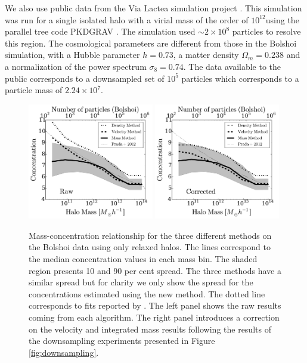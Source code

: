\documentclass{emulateapj}
\newcommand{\hMsun}{{\ifmmode{h^{-1}{\rm {M_{\odot}}}}\else{$h^{-1}{\rm{M_{\odot}}}$}\fi}}
\begin{document}
We also use public data from the Via Lactea simulation project
\citep{2008Natur.454..735D}.  
This simulation was run for a single isolated halo with a virial mass
of the order of $10^{12}$\hMsun using the parallel tree code PKDGRAV
\citep{2001PhDT........21S}.  
The simulation used $\sim 2\times 10^{8}$ particles to resolve this
region.
The cosmological parameters are different from those in the Bolshoi
simulation, with a Hubble parameter $h=0.73$, a matter density
$\Omega_m=0.238$ and a normalization of the power spectrum
$\sigma_8=0.74$. 
The data available to the public corresponds to a downsampled set 
of $10^5$ particles which corresponds to a particle mass of
$2.24\times 10^{7}$\hMsun.  





\begin{figure}
\begin{center}
  \includegraphics[width=0.49\textwidth]{concentration_bolshoi.pdf}
  \includegraphics[width=0.49\textwidth]{concentration_bolshoi_corrected.pdf}
\end{center}
\vspace{-0.5cm}
\caption{Mass-concentration relationship for the three different
  methods on the Bolshoi data using only relaxed halos.
  The lines correspond to the median concentration values in each mass
  bin.  
  The shaded region presents 10 and 90 per cent spread. 
  The three methods have a similar spread but for clarity we only show
  the spread for the concentrations estimated using the new method.   
  The dotted line corresponds to fits reported by \citep{Prada2012}.
  The left panel shows the raw results coming from each algorithm. 
  The right panel introduces a correction on the velocity and
  integrated mass results following the results of the downsampling
  experiments presented in Figure 
  \ref{fig:downsampling}.
  \label{fig:concentration}} 
\end{figure}
\end{document}
